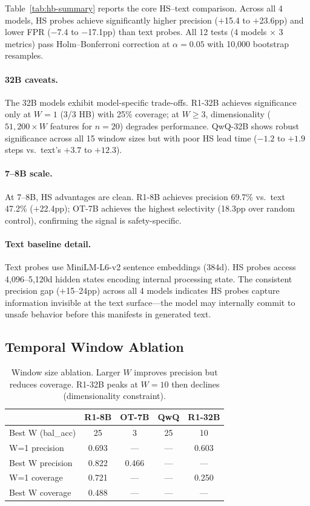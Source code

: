 \documentclass[11pt]{article}
\begin{document}
Table~\ref{tab:hb-summary} reports the core HS--text comparison.
Across all 4 models, HS probes achieve significantly higher precision ($+$15.4 to $+$23.6pp) and lower FPR ($-$7.4 to $-$17.1pp) than text probes.
All 12 tests (4 models $\times$ 3 metrics) pass Holm--Bonferroni correction at $\alpha{=}0.05$ with 10{,}000 bootstrap resamples.

\paragraph{32B caveats.}
The 32B models exhibit model-specific trade-offs.
R1-32B achieves significance only at $W{=}1$ (3/3 HB) with 25\% coverage; at $W{\geq}3$, dimensionality ($51{,}200 \times W$ features for $n{=}20$) degrades performance.
QwQ-32B shows robust significance across all 15 window sizes but with poor HS lead time ($-1.2$ to $+1.9$ steps vs.\ text's $+3.7$ to $+12.3$).

\paragraph{7--8B scale.}
At 7--8B, HS advantages are clean.
R1-8B achieves precision 69.7\% vs.\ text 47.2\% ($+$22.4pp); OT-7B achieves the highest selectivity (18.3pp over random control), confirming the signal is safety-specific.

\paragraph{Text baseline detail.}
Text probes use MiniLM-L6-v2 sentence embeddings (384d).
HS probes access 4{,}096--5{,}120d hidden states encoding internal processing state.
The consistent precision gap ($+$15--24pp) across all 4 models indicates HS probes capture information invisible at the text surface---the model may internally commit to unsafe behavior before this manifests in generated text.


\subsection{Temporal Window Ablation}

\begin{table}[t]
\centering
\small
\begin{tabular}{@{}lcccc@{}}
\toprule
& \textbf{R1-8B} & \textbf{OT-7B} & \textbf{QwQ} & \textbf{R1-32B} \\
\midrule
Best W (bal\_acc) & 25 & 3 & 25 & 10 \\
W=1 precision & 0.693 & --- & --- & 0.603 \\
Best W precision & 0.822 & 0.466 & --- & --- \\
W=1 coverage & 0.721 & --- & --- & 0.250 \\
Best W coverage & 0.488 & --- & --- & --- \\
\bottomrule
\end{tabular}
\caption{Window size ablation. Larger $W$ improves precision but reduces coverage. R1-32B peaks at $W{=}10$ then declines (dimensionality constraint).}
\label{tab:window}
\end{table}
\end{document}
